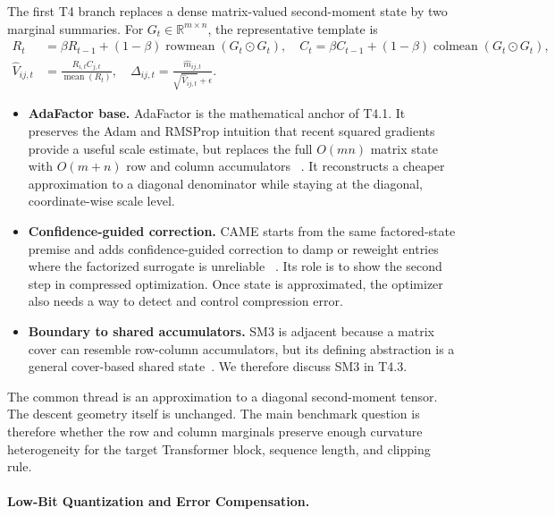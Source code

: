 The first T4 branch replaces a dense matrix-valued second-moment state by two
marginal summaries.  For $G_t\in\mathbb{R}^{m\times n}$, the representative
template is
\begin{align}
  R_t &= \beta R_{t-1}+(1-\beta)\operatorname{rowmean}(G_t\odot G_t), \quad
  C_t = \beta C_{t-1}+(1-\beta)\operatorname{colmean}(G_t\odot G_t), \\
  \widehat{V}_{ij,t} &=\frac{R_{i,t}C_{j,t}}{\operatorname{mean}(R_t)},\quad
  \Delta_{ij,t}=\frac{\widehat{m}_{ij,t}}{\sqrt{\widehat{V}_{ij,t}}+\epsilon}.
  \label{eq:t4-row-column-template}
\end{align}
\begin{itemize}
  \setlength{\itemsep}{2pt}
  \item \textbf{AdaFactor base.}
  AdaFactor is the mathematical anchor of T4.1.  It preserves the
  Adam and RMSProp intuition that recent squared
  gradients provide a useful scale estimate, but replaces the full
  $O(mn)$ matrix state with $O(m+n)$ row and column accumulators
  ~\citep{shazeer2018adafactor}.  It reconstructs a cheaper approximation to a
  diagonal denominator while staying at the diagonal, coordinate-wise scale level.
  \item \textbf{Confidence-guided correction.}  CAME starts from the same
  factored-state premise and adds confidence-guided correction to damp or
  reweight entries where the factorized surrogate is unreliable
  ~\citep{luo2023came}.  Its role is to show the second step in compressed
  optimization.  Once state is approximated, the optimizer also needs a way to
  detect and control compression error.
  \item \textbf{Boundary to shared accumulators.}  SM3 is adjacent because a
  matrix cover can resemble row-column accumulators, but its defining
  abstraction is a general cover-based shared state~\citep{anil2019memory}.  We therefore
  discuss SM3 in T4.3.
\end{itemize}

The common thread is an approximation to a diagonal second-moment tensor.  The
descent geometry itself is unchanged.  The main benchmark question is therefore
whether the row and column marginals preserve enough curvature heterogeneity
for the target Transformer block, sequence length, and clipping rule.

\paragraph{Low-Bit Quantization and Error Compensation.}
\label{sec:t4-low-bit}

